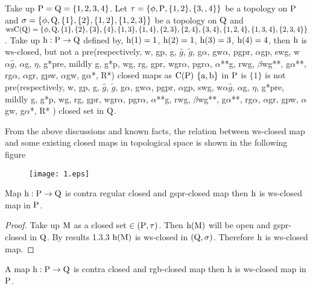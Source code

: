\begin{exm}\label{exam4.2.13}
Take up $\mathrm{P}=\mathrm{Q}= \{1, 2, 3, 4\}$. Let $\tau= \{\phi, \mathrm{P}, \{1,2\}, \{3,,4 \}\}$ be a topology on $\mathrm{P}$ and $\sigma=\{\phi, \mathrm{Q}, \{1\}, \{2\}, \{1,2\},\{1,2,3\}\}$ be a topology on $\mathrm{Q}$ and $\ws\TSC(\TSQ)=\{\phi, \TSQ, \{1\},\{2\},\{3\},\{4\},\{1,3\}, \{1,4\},\{2,3\},\{2,4\},\{3,4\},\{1,2,4\},\break \{1,3,4\}, \{2,3,4\}\}$. Take up $\mathrm{h}: \mathrm{P} \to \mathrm{Q}$ defined by, $\mathrm{h}(1) = 1$, $\mathrm{h}(2) = 1$, $\mathrm{h}(3) = 3$, $\mathrm{h}(4)=4$, then $\mathrm{h}$ is ws-closed, but not a pre(respectively, w, gp, g, $\hat{g}$, $\tilde{g}$, g$\alpha$, gw$\alpha$, pgpr, $\alpha$gp, swg, w$\alpha\hat{g}$, $\alpha$g, $\eta$, g*pre, mildly g, g*p, wg, rg, gpr, wgr$\alpha$, pgr$\alpha$, $\alpha$**g, rwg, $\beta$wg**, g$\alpha$**, rg$\alpha$, $\alpha$gr, gpw, $\alpha$gw, g$\alpha$*, R*) closed maps as $\mathrm{C}(\mathrm{P})$ $\{\mathrm{a} , \mathrm{b}\}$ in $\mathrm{P}$ is $\{1\}$ is not pre(respectively, w, gp, g, $\hat{g}$, $\tilde{g}$, g$\alpha$, gw$\alpha$, pgpr, $\alpha$gp, swg, w$\alpha\hat{g}$, $\alpha$g, $\eta$, g*pre, mildly g, g*p, wg, rg, gpr, wgr$\alpha$, pgr$\alpha$, $\alpha$**g, rwg, $\beta$wg**, g$\alpha$**, rg$\alpha$, $\alpha$gr, gpw, $\alpha$gw, g$\alpha$*, R* ) closed set in $\mathrm{Q}$.
\end{exm}

\begin{rem}\label{rem4.2.14}
From the above discussions and known facts, the relation between ws-closed map and some existing closed maps in topological space is shown in the following figure
\begin{figure}[H]
\centering
\texttt{[image: 1.eps]}
\end{figure}
\end{rem}

\begin{thm}\label{thm4.2.15}
Map $\mathrm{h}: \mathrm{P} \to \mathrm{Q}$ is contra regular closed and gspr-closed map then $\mathrm{h}$ is ws-closed map in $\mathrm{P}$.
\end{thm}

\begin{proof}
Take up $\mathrm{M}$ as a closed set $\in (\mathrm{P}, \tau)$. Then $\mathrm{h} (\mathrm{M})$ will be open and gspr-closed in $\mathrm{Q}$. By results 1.3.3 $\mathrm{h} (\mathrm{M})$ is ws-closed in $(\mathrm{Q}, \sigma)$. Therefore $\mathrm{h}$ is ws-closed map.
\end{proof}

\begin{thm}\label{thm4.2.16}
A map $\mathrm{h}: \mathrm{P} \to \mathrm{Q}$ is contra closed and rgb-closed map then h is ws-closed map in $\mathrm{P}$.
\end{thm}

